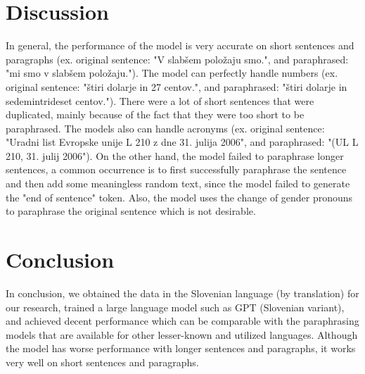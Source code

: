 \documentclass[fleqn,moreauthors,10pt]{ds_report}
\begin{document}
\section*{Discussion}
In general, the performance of the model is very accurate on short sentences and paragraphs (ex. original sentence: "V slab\v{s}em polo\v{z}aju smo.", and paraphrased: "mi smo v slab\v{s}em polo\v{z}aju."). The model can perfectly handle numbers (ex. original sentence: "\v{s}tiri dolarje in 27 centov.", and paraphrased: "\v{s}tiri dolarje in sedemintrideset centov."). There were a lot of short sentences that were duplicated, mainly because of the fact that they were too short to be paraphrased. The models also can handle acronyms (ex. original sentence: "Uradni list Evropske unije L 210 z dne 31. julija 2006", and paraphrased: "(UL L 210, 31. julij 2006"). On the other hand, the model failed to paraphrase longer sentences, a common occurrence is to first successfully paraphrase the sentence and then add some meaningless random text, since the model failed to generate the "end of sentence" token. Also, the model uses the change of gender pronouns to paraphrase the original sentence which is not desirable.








\section*{Conclusion}
In conclusion, we obtained the data in the Slovenian language (by translation) for our research, trained a large language model such as GPT (Slovenian variant), and achieved decent performance which can be comparable with the paraphrasing models that are available for other lesser-known and utilized languages. Although the model has worse performance with longer sentences and paragraphs, it works very well on short sentences and paragraphs.
\end{document}
